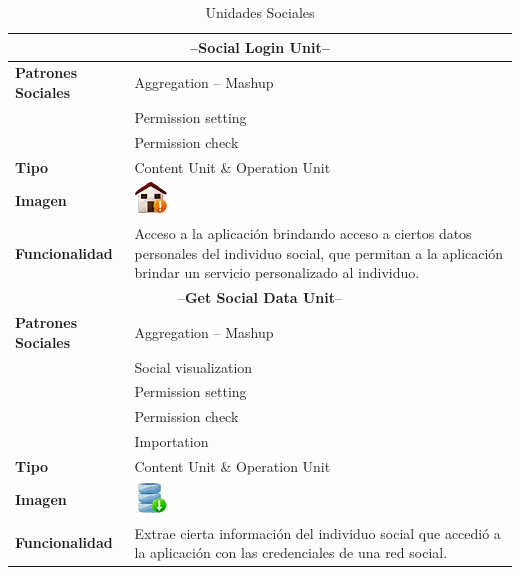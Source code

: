 \documentclass[oneside,12pt,a4paper]{memoir}%
\begin{document}
	\begin{table}[htbp]
	\centering
	\caption{Unidades Sociales}
		\begin{tabular}{|l|p{12cm}|}
			\hline
			\multicolumn{2}{|c|}{--\textbf{Social Login Unit}--}					\\\hline 
			\textbf{Patrones Sociales}	&	Aggregation -- Mashup					\\
										&	Permission setting 						\\
										&	Permission check 						\\\hline
			\textbf{Tipo}				&	Content Unit \& Operation Unit			\\\hline
			\textbf{Imagen} & \includegraphics{units/SocialLoginUnit.png}			\\\hline
			\textbf{Funcionalidad}		&	Acceso a la aplicaci\'on brindando acceso a
			ciertos datos personales del individuo social, que permitan a la
			aplicaci\'on brindar un servicio personalizado al individuo.			\\\hline
			
			\multicolumn{2}{|c|}{--\textbf{Get Social Data Unit}--}					\\\hline 
			\textbf{Patrones Sociales}	&	Aggregation -- Mashup					\\
										&	Social visualization					\\
										&	Permission setting						\\
										&	Permission check						\\
										&	Importation								\\\hline
			\textbf{Tipo}				&	Content Unit \& Operation Unit			\\\hline 
			\textbf{Imagen} & \includegraphics{units/GetSocialDataUnit.png}			\\\hline
			\textbf{Funcionalidad}		&	Extrae cierta informaci\'on del individuo social
			que accedi\'o a la aplicaci\'on con las credenciales de una red
			social.																	\\\hline
			

\end{tabular}
\end{table}
\end{document}
